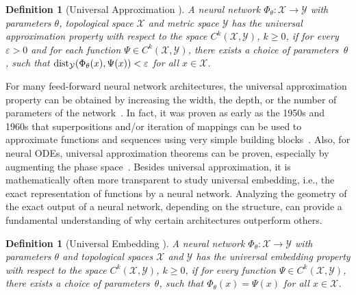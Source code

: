 \documentclass[10pt]{article}
\newtheorem{definition}[theorem]{Definition}
\begin{document}
\begin{definition}[Universal Approximation  \cite{KuehnKuntz2023}] \label{cekk_def:universalapproximation}
	A neural network $\Phi_\theta: \mathcal{X} \rightarrow \mathcal{Y}$ with parameters $\theta$, topological space $\mathcal{X}$ and metric space $\mathcal{Y}$ has the universal approximation property with respect to the space $C^k(\mathcal{X},\mathcal{Y})$, $k \geq 0$, if for every $\varepsilon >0$ and for each function $\Psi \in C^k(\mathcal{X},\mathcal{Y})$, there exists a choice of parameters~$\theta$, such that $\textup{dist}_\mathcal{Y}(\Phi_\theta(x),\Psi(x)) < \varepsilon$ for all $x \in \mathcal{X}$.
\end{definition}

For many feed-forward neural network architectures, the universal approximation property can be obtained by increasing the width, the depth, or the number of parameters of the network~\cite{Cybenko1989, Hornik1989, Lin2018, Pinkus1999, Schaefer2006}. In fact, it was proven as early as the 1950s and 1960s that superpositions and/or iteration of mappings can be used to approximate functions and sequences using very simple building blocks~\cite{Kolmogorov1,Sharkovskii1}. Also, for neural ODEs, universal approximation theorems can be proven, especially by augmenting the phase space~\cite{Dupont2019, Kidger2022, KuehnKuntz2023, RuizBalet2023, Zhang2020}. Besides universal approximation, it is mathematically often more transparent to study universal embedding, i.e., the exact representation of functions by a neural network. Analyzing the geometry of the exact output of a neural network, depending on the structure, can provide a fundamental understanding of why certain architectures outperform others.  


\begin{definition}[Universal Embedding  \cite{KuehnKuntz2023}]\label{cekk_def:universalembedding}
	A neural network $\Phi_\theta: \mathcal{X} \rightarrow \mathcal{Y}$ with parameters $\theta$ and topological spaces $\mathcal{X}$ and $\mathcal{Y}$ has the universal embedding property with respect to the space $C^k(\mathcal{X},\mathcal{Y})$, $k \geq 0$, if for every function $ \Psi \in C^k(\mathcal{X},\mathcal{Y})$, there exists a choice of parameters~$\theta$, such that $\Phi_\theta(x) = \Psi(x)$ for all $x \in \mathcal{X}$.
\end{definition}
\end{document}
